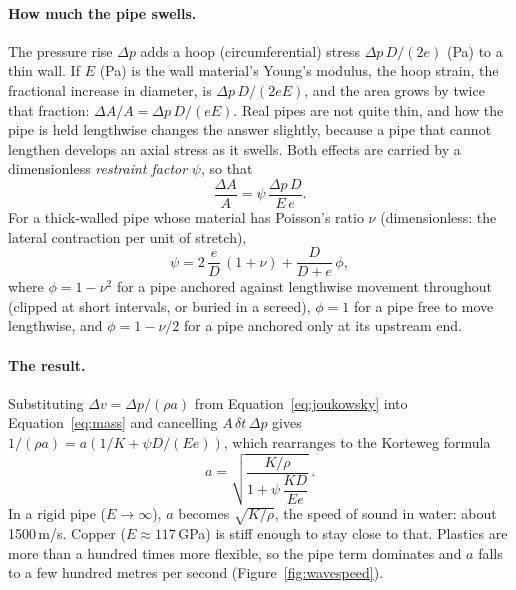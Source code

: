\documentclass[a4paper,justified,nobib]{tufte-handout}
\newcommand{\sidecite}[2][]{\sidenote{\citet{#2}\ifx&#1&\else, #1\fi.}}
\begin{document}
\paragraph{How much the pipe swells.} The pressure rise $\Delta p$ adds a hoop
(circumferential) stress $\Delta p\,D/(2e)$ (Pa) to a thin wall. If $E$ (Pa) is
the wall material's Young's modulus, the hoop strain, the fractional increase in
diameter, is $\Delta p\,D/(2eE)$, and the area grows by twice that fraction:
$\Delta A/A=\Delta p\,D/(eE)$. Real pipes are not quite thin, and how the pipe
is held lengthwise changes the answer slightly, because a pipe that cannot
lengthen develops an axial stress as it swells. Both effects are carried by a
dimensionless \emph{restraint factor} $\psi$, so that
\begin{equation}
  \frac{\Delta A}{A}=\psi\,\frac{\Delta p\,D}{E\,e}.
\end{equation}
For a thick-walled pipe whose material has Poisson's ratio $\nu$ (dimensionless:
the lateral contraction per unit of stretch),\sidecite[\S2.4]{wylie1993}
\begin{equation}
  \psi = 2\,\frac{e}{D}\,(1+\nu) + \frac{D}{D+e}\,\phi,
  \label{eq:psi}
\end{equation}
where $\phi=1-\nu^2$ for a pipe anchored against lengthwise movement throughout
(clipped at short intervals, or buried in a screed), $\phi=1$ for a pipe free to
move lengthwise, and $\phi=1-\nu/2$ for a pipe anchored only at its upstream
end.

\paragraph{The result.} Substituting $\Delta v=\Delta p/(\rho a)$ from
Equation~\ref{eq:joukowsky} into Equation~\ref{eq:mass} and cancelling
$A\,\delta t\,\Delta p$ gives $1/(\rho a)=a\left(1/K+\psi D/(Ee)\right)$, which
rearranges to the Korteweg formula
\begin{equation}
  a = \sqrt{\frac{K/\rho}{1+\psi\,\dfrac{K D}{E e}}}\,.
  \label{eq:wavespeed}
\end{equation}
In a rigid pipe ($E\to\infty$), $a$ becomes $\sqrt{K/\rho}$, the speed of sound
in water: about 1500\,m/s. Copper ($E\approx117$\,GPa) is stiff enough to stay
close to that. Plastics are more than a hundred times more flexible, so the
pipe term dominates and $a$ falls to a few hundred metres per second
(Figure~\ref{fig:wavespeed}).
\end{document}

